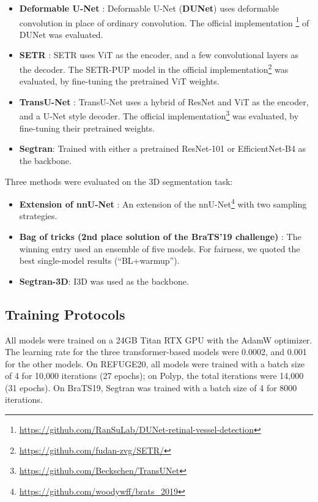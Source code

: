 \documentclass{article}
\begin{document}
\begin{itemize}
    \item \textbf{Deformable U-Net} \cite{dunet}: Deformable U-Net (\textbf{DUNet}) uses deformable convolution in place of ordinary convolution. The official implementation
\footnote{\url{https://github.com/RanSuLab/DUNet-retinal-vessel-detection}} 
of DUNet was evaluated.

    \item \textbf{SETR} \cite{SETR}: SETR uses ViT as the encoder, and a few convolutional layers as the decoder. The SETR-PUP model in the official implementation\footnote{\url{https://github.com/fudan-zvg/SETR/}} was evaluated, by fine-tuning the pretrained ViT weights.
    
    \item \textbf{TransU-Net} \cite{transunet}: TransU-Net uses a hybrid of ResNet and ViT as the encoder, and a U-Net style decoder. The official implementation\footnote{\url{https://github.com/Beckschen/TransUNet}} was evaluated, by fine-tuning their pretrained weights.

    \item \textbf{Segtran}: Trained with either a pretrained ResNet-101 or EfficientNet-B4 as the backbone.
\end{itemize}
Three methods were evaluated on the 3D segmentation task:
\begin{itemize}
    \item \textbf{Extension of nnU-Net} \cite{nnu-net-ext}: An extension of the nnU-Net\footnote{\url{https://github.com/woodywff/brats_2019}} with two sampling strategies.
    \item \textbf{Bag of tricks (2nd place solution of the BraTS'19 challenge)} \cite{bag-tricks}: The winning entry used an ensemble of five models. For fairness, we quoted the best single-model results (``BL+warmup'').
    \item \textbf{Segtran-3D}: I3D \cite{i3d} was used as the backbone.
\end{itemize}

\subsection{Training Protocols}
All models were trained on a 24GB Titan RTX GPU with the AdamW optimizer. The learning rate for the three transformer-based models were 0.0002, and 0.001 for the other models. On REFUGE20, all models were trained with a batch size of 4 for 10,000 iterations (27 epochs); on Polyp, the total iterations were 14,000 (31 epochs). On BraTS19, Segtran was trained with a batch size of 4 for 8000 iterations.
\end{document}
